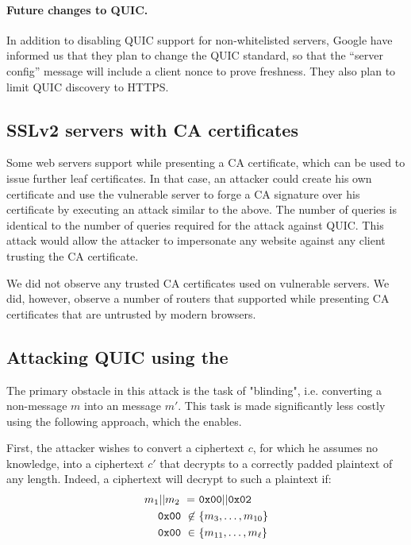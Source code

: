 \paragraph{Future changes to QUIC\@.}
In addition to disabling QUIC support for non-whitelisted servers, Google have informed us that they plan to change the QUIC standard, so that the ``server config'' message will include a client nonce to prove freshness. They also plan to limit QUIC discovery to HTTPS.


\ifext
\subsection{SSLv2 servers with CA certificates} 
Some web servers support \ssltwo while presenting a CA certificate,
which can be used to issue further leaf certificates. In that case, an attacker
could create his own certificate and use the vulnerable server to forge a CA
signature over his certificate by executing an attack similar to the above.
The number of queries is identical to the number of queries required for the
attack against QUIC. This attack would allow the attacker to impersonate any
website against any client trusting the CA certificate.

We did not observe any trusted CA certificates used on vulnerable servers.
We did, however, observe a number of routers that supported \ssltwo
while presenting CA certificates that are untrusted by modern browsers.
\fi

\subsection{Attacking QUIC using the \tOracleSSLleaky}
The primary obstacle in this attack is the task of "blinding",
i.e. converting a non-\sslconform message $m$ into an \sslconform message $m'$.
This task is made significantly less costly using the following approach,
which the \tOracleSSLleaky enables.

First, the attacker wishes to convert a ciphertext $c$, for which he assumes no knowledge,
into a ciphertext $c'$ that decrypts to a correctly padded plaintext of any length.
Indeed, a ciphertext will decrypt to such a plaintext if:
\begin{equation*} 
	\begin{split} 
		m_1||m_2 \text{ } = &\text{ } {\tt 0x00} || {\tt 0x02}\\
		{\tt 0x00} \text{ } \not \in &\text{ } \{m_3, \ldots,m_{10}\}\\ 
		{\tt 0x00} \text{ } \in &\text{ } \{m_{11}, \ldots,m_{\ell}\}\\ 
	\end{split}
\end{equation*}

